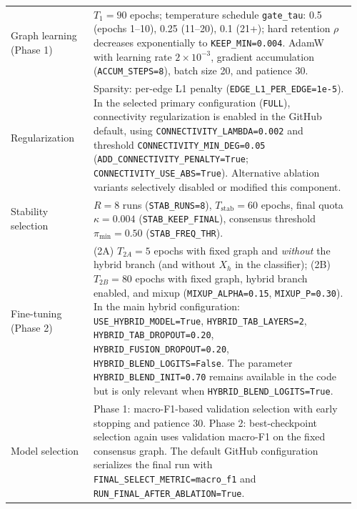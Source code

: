 \documentclass[11pt,a4paper]{article}
\begin{document}
\begin{table}[!htbp]
\begin{tabular}{@{}p{0.23\linewidth}p{0.73\linewidth}@{}}
Graph learning (Phase 1) &
$T_1=90$ epochs; temperature schedule \texttt{gate\_tau}: 0.5 (epochs 1--10), 0.25 (11--20), 0.1 (21+); hard retention $\rho$ decreases exponentially to \texttt{KEEP\_MIN=0.004}. AdamW \citep{Kingma2015Adam,Loshchilov2019AdamW} with learning rate $2\times10^{-3}$, gradient accumulation (\texttt{ACCUM\_STEPS=8}), batch size 20, and patience 30. \\

Regularization &
Sparsity: per-edge L1 penalty (\texttt{EDGE\_L1\_PER\_EDGE=1e-5}). In the selected primary configuration (\texttt{FULL}), connectivity regularization is enabled in the GitHub default, using \texttt{CONNECTIVITY\_LAMBDA=0.002} and threshold \texttt{CONNECTIVITY\_MIN\_DEG=0.05} (\texttt{ADD\_CONNECTIVITY\_PENALTY=True}; \texttt{CONNECTIVITY\_USE\_ABS=True}). Alternative ablation variants selectively disabled or modified this component. \\

Stability selection &
$R=8$ runs (\texttt{STAB\_RUNS=8}), $T_{\mathrm{stab}}=60$ epochs, final quota $\kappa=0.004$ (\texttt{STAB\_KEEP\_FINAL}), consensus threshold $\pi_{\min}=0.50$ (\texttt{STAB\_FREQ\_THR}). \\

Fine-tuning (Phase 2) &
(2A) $T_{2A}=5$ epochs with fixed graph and \emph{without} the hybrid branch (and without $X_h$ in the classifier); (2B) $T_{2B}=80$ epochs with fixed graph, hybrid branch enabled, and mixup (\texttt{MIXUP\_ALPHA=0.15}, \texttt{MIXUP\_P=0.30}). In the main hybrid configuration: \texttt{USE\_HYBRID\_MODEL=True}, \texttt{HYBRID\_TAB\_LAYERS=2}, \texttt{HYBRID\_TAB\_DROPOUT=0.20}, \texttt{HYBRID\_FUSION\_DROPOUT=0.20}, \texttt{HYBRID\_BLEND\_LOGITS=False}. The parameter \texttt{HYBRID\_BLEND\_INIT=0.70} remains available in the code but is only relevant when \texttt{HYBRID\_BLEND\_LOGITS=True}. \\

Model selection &
Phase 1: macro-F1-based validation selection with early stopping and patience 30. Phase 2: best-checkpoint selection again uses validation macro-F1 on the fixed consensus graph. The default GitHub configuration serializes the final run with \texttt{FINAL\_SELECT\_METRIC=macro\_f1} and \texttt{RUN\_FINAL\_AFTER\_ABLATION=True}. \\
\bottomrule
\end{tabular}
\end{table}


\end{document}
